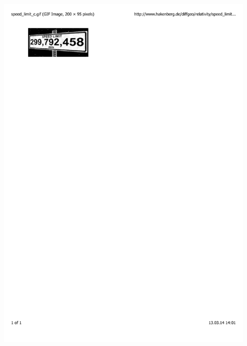 \documentclass[mathserif,8pt]{beamer}
\begin{document}
\begin{frame}
\begin{columns}
\begin{column}{.60\textwidth}
	\includegraphics[viewport = 60 710 210 780, clip, scale=0.5]{figures/speed_limit.pdf}
    \end{column}
    \begin{column}{.40\textwidth}
	\centering

\end{column}
\end{columns}
\end{frame}
\end{document}
